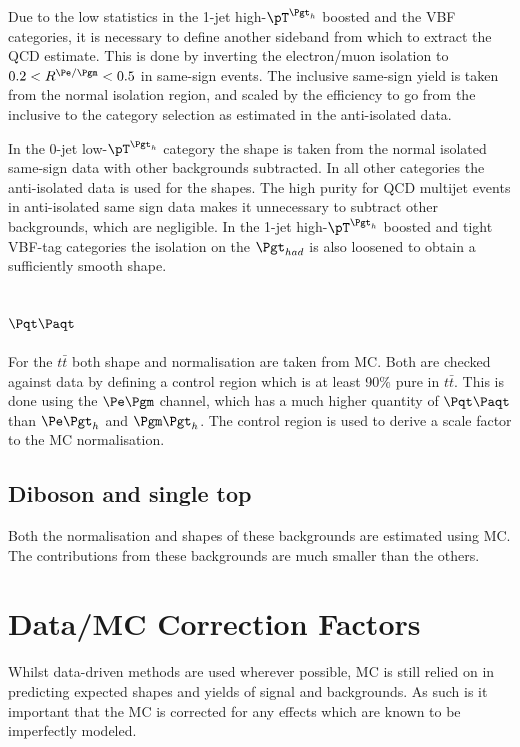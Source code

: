 Due to the low statistics in the 1-jet high-$\pT^{\Pgth}$ boosted and the VBF
categories, it is necessary to define another
sideband from which to extract the QCD estimate. This is done by inverting the
electron/muon isolation to $0.2<R^{\Pe/\Pgm}<0.5$ in same-sign events. The
inclusive same-sign yield is taken from the normal isolation region, and scaled
by the efficiency to go from the inclusive to the category selection as
estimated in the anti-isolated data. 

In the 0-jet low-$\pT^{\Pgth}$ category the shape is taken from the normal
isolated same-sign data with other backgrounds subtracted. In all other
categories the anti-isolated data is used for the shapes. The high purity for
QCD multijet events in anti-isolated same sign data makes it unnecessary to
subtract other backgrounds, which are negligible. In the 1-jet
high-$\pT^{\Pgth}$ boosted and tight VBF-tag categories the isolation on the
$\Pgt_{had}$ is also loosened to obtain a sufficiently smooth shape.  

\subsection{$\ttbar$}
\label{sec:backgroundEstimation_TT}

For the $t \bar{t}$ both shape and normalisation are taken from MC. Both are checked
against data by defining a control region which is at least 90$\%$ pure in
$t \bar{t}$. This is done using the $\emu$ channel, which has a much higher
quantity of $\ttbar$ than $\etau$ and $\mutau$. The control region is used to
derive a scale factor to the \ac{MC} normalisation. 

\subsection{Diboson and single top}
Both the normalisation and shapes of these backgrounds are estimated using MC.
The contributions from these backgrounds are much smaller than the others.

\section{Data/MC Correction Factors}
\label{sec:datamcfactors}

Whilst data-driven methods are used wherever possible, MC is still
relied on in predicting expected shapes and yields of signal and backgrounds.
As such is it important that the MC is corrected for
any effects which are known to be imperfectly modeled. 

